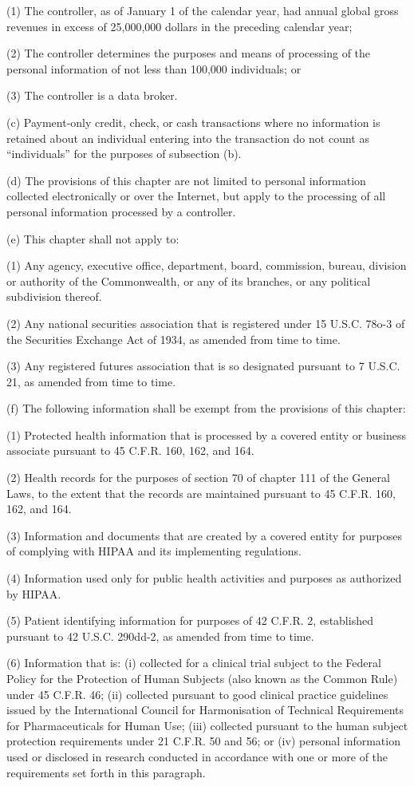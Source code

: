 (1) The controller, as of January 1 of the calendar year, had annual global gross revenues in excess of 25,000,000 dollars in the preceding calendar year;

(2) The controller determines the purposes and means of processing of the personal information of not less than 100,000 individuals; or

(3) The controller is a data broker.

(c) Payment-only credit, check, or cash transactions where no information is retained about an individual entering into the transaction do not count as “individuals” for the purposes of subsection (b).

(d) The provisions of this chapter are not limited to personal information collected electronically or over the Internet, but apply to the processing of all personal information processed by a controller.

(e) This chapter shall not apply to:

(1) Any agency, executive office, department, board, commission, bureau, division or authority of the Commonwealth, or any of its branches, or any political subdivision thereof.

(2) Any national securities association that is registered under 15 U.S.C. 78o-3 of the Securities Exchange Act of 1934, as amended from time to time.

(3) Any registered futures association that is so designated pursuant to 7 U.S.C. 21, as amended from time to time.

(f) The following information shall be exempt from the provisions of this chapter:

(1) Protected health information that is processed by a covered entity or business associate pursuant to 45 C.F.R. 160, 162, and 164.

(2) Health records for the purposes of section 70 of chapter 111 of the General Laws, to the extent that the records are maintained pursuant to 45 C.F.R. 160, 162, and 164.

(3) Information and documents that are created by a covered entity for purposes of complying with HIPAA and its implementing regulations.

(4) Information used only for public health activities and purposes as authorized by HIPAA.

(5) Patient identifying information for purposes of 42 C.F.R. 2, established pursuant to 42 U.S.C. 290dd-2, as amended from time to time.

(6) Information that is: (i) collected for a clinical trial subject to the Federal Policy for the Protection of Human Subjects (also known as the Common Rule) under 45 C.F.R. 46; (ii) collected pursuant to good clinical practice guidelines issued by the International Council for Harmonisation of Technical Requirements for Pharmaceuticals for Human Use; (iii) collected pursuant to the human subject protection requirements under 21 C.F.R. 50 and 56; or (iv) personal information used or disclosed in research conducted in accordance with one or more of the requirements set forth in this paragraph.

